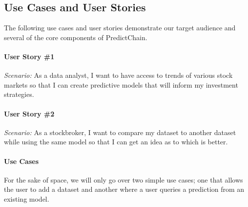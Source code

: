 \documentclass{ledger}
\begin{document}
\subsection{Use Cases and User Stories}

The following use cases and user stories demonstrate our target audience and several of the core components of PredictChain.

\paragraph{User Story \#1}
\textit{Scenario:} As a data analyst, I want to have access to trends of various stock markets so that I can create
predictive models that will inform my investment strategies.

\paragraph{User Story \#2}
\textit{Scenario:} As a stockbroker, I want to compare my dataset to another dataset while using the same model so that
I can get an idea as to which is better.

\paragraph{Use Cases}
For the sake of space, we will only go over two simple use cases; one that allows the user to add a dataset and
another where a user queries a prediction from an existing model.
\end{document}
